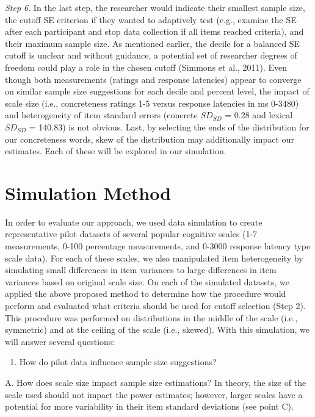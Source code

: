 \documentclass[
  man]{apa7}
\providecommand{\tightlist}{%
  \setlength{\itemsep}{0pt}\setlength{\parskip}{0pt}}
\begin{document}
\emph{Step 6}. In the last step, the researcher would indicate their smallest sample size, the cutoff SE criterion if they wanted to adaptively test (e.g., examine the SE after each participant and stop data collection if all items reached criteria), and their maximum sample size. As mentioned earlier, the decile for a balanced SE cutoff is unclear and without guidance, a potential set of researcher degrees of freedom could play a role in the chosen cutoff (Simmons et al., 2011). Even though both measurements (ratings and response latencies) appear to converge on similar sample size suggestions for each decile and percent level, the impact of scale size (i.e., concreteness ratings 1-5 versus response latencies in ms 0-3480) and heterogeneity of item standard errors (concrete \(SD_{SD}\) = 0.28 and lexical \(SD_{SD}\) = 140.83) is not obvious. Last, by selecting the ends of the distribution for our concreteness words, skew of the distribution may additionally impact our estimates. Each of these will be explored in our simulation.

\section{Simulation Method}\label{simulation-method}

In order to evaluate our approach, we used data simulation to create representative pilot datasets of several popular cognitive scales (1-7 measurements, 0-100 percentage measurements, and 0-3000 response latency type scale data). For each of these scales, we also manipulated item heterogeneity by simulating small differences in item variances to large differences in item variances based on original scale size. On each of the simulated datasets, we applied the above proposed method to determine how the procedure would perform and evaluated what criteria should be used for cutoff selection (Step 2). This procedure was performed on distributions in the middle of the scale (i.e., symmetric) and at the ceiling of the scale (i.e., skewed). With this simulation, we will answer several questions:

\begin{enumerate}
\def\labelenumi{\arabic{enumi})}
\tightlist
\item
  How do pilot data influence sample size suggestions?
\end{enumerate}

A. How does scale size impact sample size estimations? In theory, the size of the scale used should not impact the power estimates; however, larger scales have a potential for more variability in their item standard deviations (see point C).
\end{document}
